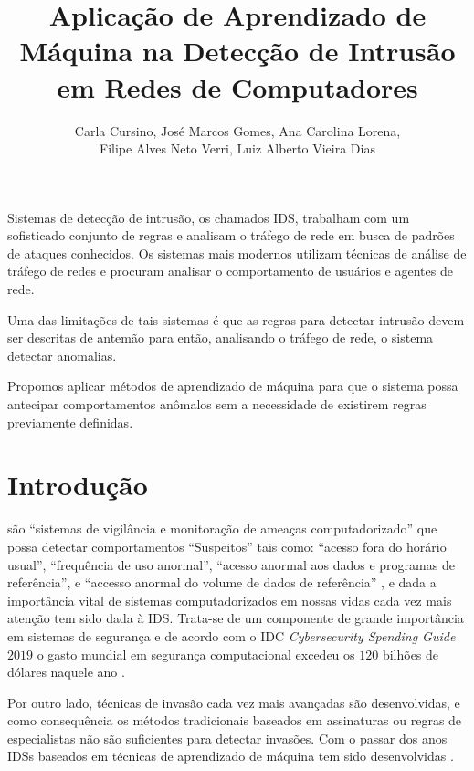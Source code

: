 \documentclass[twoside]{article}
\title{Aplicação de Aprendizado de Máquina na Detecção de Intrusão em Redes de Computadores}
\author{
    Carla Cursino\inst{1}\orcidIcon{0000-0002-7718-5897},
    José Marcos Gomes\inst{1}\orcidIcon{0000-0001-9223-7512},
    Ana Carolina Lorena\inst{1}\orcidIcon{0000-0002-6140-571X}, \\
    Filipe Alves Neto Verri\inst{1}\orcidIcon{0000-0002-8240-5129},
    Luiz Alberto Vieira Dias\inst{1}\orcidIcon{0000-0001-5958-8011}
}
\begin{document}
 

\maketitle

\begin{resumo}\footnotesize
    Sistemas de detecção de intrusão, os chamados \gls{IDS}, trabalham com um sofisticado conjunto de regras e analisam o tráfego de rede em busca de padrões de ataques conhecidos. Os sistemas mais modernos utilizam técnicas de análise de tráfego de redes e procuram analisar o comportamento de usuários e agentes de rede.

    Uma das limitações de tais sistemas é que as regras para detectar intrusão devem ser descritas de antemão para então, analisando o tráfego de rede, o sistema detectar anomalias.
    
    Propomos aplicar métodos de aprendizado de máquina para que o sistema possa antecipar comportamentos anômalos sem a necessidade de existirem regras previamente definidas.
\end{resumo}\normalsize

\section{Introdução}

 são ``sistemas de vigilância e monitoração de ameaças computadorizado'' que possa detectar comportamentos ``Suspeitos'' tais como: ``acesso fora do horário usual'', ``frequência de uso anormal'', ``acesso anormal aos dados e programas de referência'', e ``accesso anormal do volume de dados de referência'' \cite{anderson1980computer}, e dada a importância vital de sistemas computadorizados em nossas vidas cada vez mais atenção tem sido dada à \gls{IDS}. Trata-se de um componente de grande importância em sistemas de segurança \cite{milenkoski2015evaluating} e de acordo com o \gls{IDC} \textit{Cybersecurity Spending Guide $2019$} o gasto mundial em segurança computacional excedeu os $120$ bilhões de dólares naquele ano \cite{idc_security_spending_2021}.

Por outro lado, técnicas de invasão cada vez mais avançadas são desenvolvidas, e como consequência os métodos tradicionais baseados em assinaturas ou regras de especialistas não são suficientes \cite{radford2018network} para detectar invasões. Com o passar dos anos \glspl{IDS} baseados em técnicas de aprendizado de máquina tem sido desenvolvidas \cite{milenkoski2015evaluating}.
\end{document}

